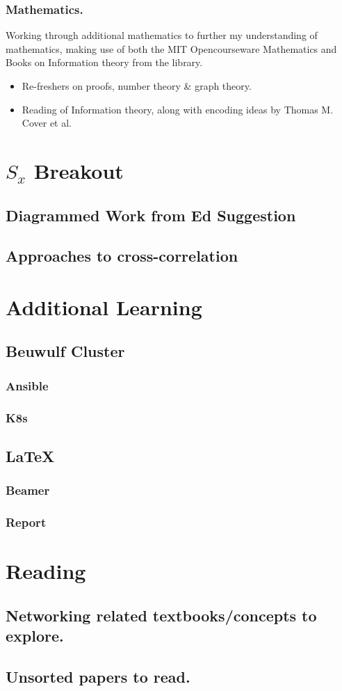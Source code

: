\documentclass[]{scrreprt}
\begin{document}
\subsection{Mathematics.}
Working through additional mathematics to further my understanding of mathematics, making use of both the MIT Opencourseware Mathematics and Books on Information theory from the library.
\begin{itemize}
  \item Re-freshers on proofs, number theory \& graph theory.
  \item Reading of Information theory, along with encoding ideas by Thomas M. Cover et al.
\end{itemize}


\chapter{$S_{x}$ Breakout }
\section{Diagrammed Work from Ed Suggestion}
\section{Approaches  to cross-correlation}

\chapter{Additional Learning}
\section{Beuwulf Cluster}
\subsection{Ansible}
\subsection{K8s}
\section{\LaTeX}
\subsection{Beamer}
\subsection{Report}

\chapter{Reading}
\section{Networking related textbooks/concepts to explore.}
\section{Unsorted papers to read.}
\end{document}
